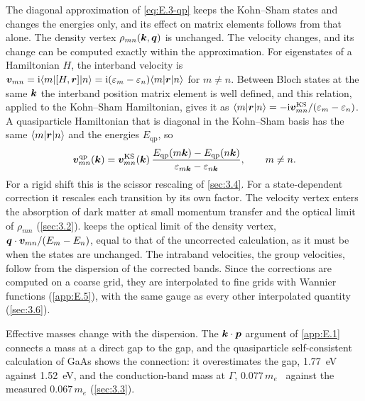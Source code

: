 The diagonal approximation of \cref{eq:E.3-qp} keeps the Kohn--Sham states and changes the energies only, and its effect on matrix elements follows from that alone. The density vertex $\rho_{mn}(\bm{k}, \bm{q})$ is unchanged. The velocity changes, and its change can be computed exactly within the approximation. For eigenstates of a Hamiltonian $H$, the interband velocity is $\bm{v}_{mn} = \mathrm{i}\langle m|[H, \bm{r}]|n\rangle = \mathrm{i}(\varepsilon_m - \varepsilon_n)\langle m|\bm{r}|n\rangle$ for $m \neq n$. Between Bloch states at the same $\bm{k}$ the interband position matrix element is well defined, and this relation, applied to the Kohn--Sham Hamiltonian, gives it as $\langle m|\bm{r}|n\rangle = -\mathrm{i}\bm{v}^{\mathrm{KS}}_{mn}/(\varepsilon_m - \varepsilon_n)$. A quasiparticle Hamiltonian that is diagonal in the Kohn--Sham basis has the same $\langle m|\bm{r}|n\rangle$ and the energies $E_{\mathrm{qp}}$, so
\begin{equation}
  \bm{v}^{\mathrm{qp}}_{mn}(\bm{k}) = \bm{v}^{\mathrm{KS}}_{mn}(\bm{k})\,\frac{E_{\mathrm{qp}}(m\bm{k}) - E_{\mathrm{qp}}(n\bm{k})}{\varepsilon_{m\bm{k}} - \varepsilon_{n\bm{k}}} , \qquad m \neq n .
  \label{eq:E.3-vrescale}
\end{equation}
For a rigid shift this is the scissor rescaling of \cref{sec:3.4}. For a state-dependent correction it rescales each transition by its own factor. The velocity vertex enters the absorption of dark matter at small momentum transfer and the optical limit of $\rho_{mn}$ (\cref{sec:3.2}).  keeps the optical limit of the density vertex, $\bm{q}\cdot\bm{v}_{mn}/(E_m - E_n)$, equal to that of the uncorrected calculation, as it must be when the states are unchanged. The intraband velocities, the group velocities, follow from the dispersion of the corrected bands. Since the corrections are computed on a coarse grid, they are interpolated to fine grids with Wannier functions (\cref{app:E.5}), with the same gauge as every other interpolated quantity (\cref{sec:3.6}).

Effective masses change with the dispersion. The $\bm{k}\cdot\bm{p}$ argument of \cref{app:E.1} connects a mass at a direct gap to the gap, and the quasiparticle self-consistent calculation of GaAs shows the connection: it overestimates the gap, \SI{1.77}{eV} against \SI{1.52}{eV}, and the conduction-band mass at $\Gamma$, $0.077\,m_e$~\cite[Fig.~2 and text]{vanschilfgaarde2006quasiparticle} against the measured $0.067\,m_e$ (\cref{sec:3.3}).

